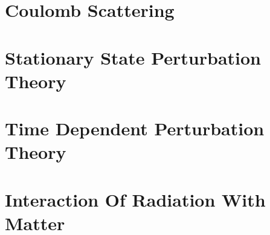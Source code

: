 \documentclass[11pt,twoside,openright]{book}
\begin{document}
\chapter{Coulomb Scattering}




\chapter{Stationary State Perturbation Theory}








\chapter{Time Dependent Perturbation Theory}






\chapter{Interaction Of Radiation With Matter}











\end{document}
